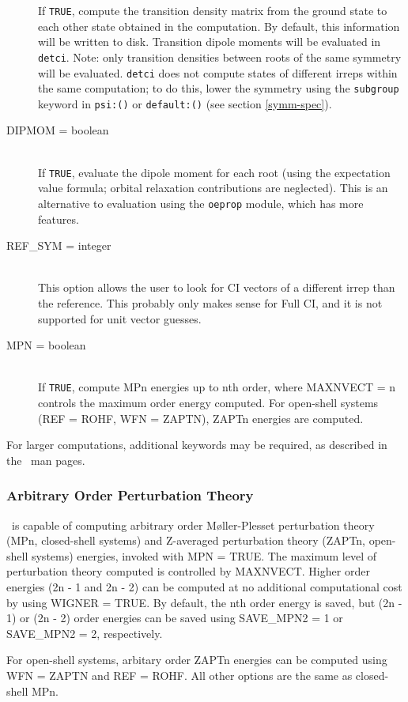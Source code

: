 \begin{description}
If {\tt TRUE}, compute the transition density matrix from the ground
state to each other state obtained in the computation.  By default,
this information will be written to disk.  Transition dipole moments
will be evaluated in {\tt detci}.  Note: only transition densities
between roots of the same symmetry will be evaluated.  {\tt detci} does not
compute states of different irreps within the same computation; to do this,
lower the symmetry using the {\tt subgroup} keyword in {\tt psi:()}
or {\tt default:()} (see section \ref{symm-spec}).
\item[DIPMOM = boolean]\mbox{}\\
If {\tt TRUE}, evaluate the dipole moment for each root (using the expectation
value formula; orbital relaxation contributions are neglected).  This is
an alternative to evaluation using the {\tt oeprop} module, which has
more features.
\item[REF\_SYM = integer]\mbox{}\\
This option allows the user to look for CI vectors of a different irrep
than the reference.  This probably only makes sense for Full CI,
and it is not supported for unit vector guesses.
\item[MPN = boolean]\mbox{}\\
If {\tt TRUE}, compute MPn energies up to nth order, where MAXNVECT = n
controls the maximum order energy computed.  For open-shell systems
(REF = ROHF, WFN = ZAPTN), ZAPTn energies are computed.
\end{description}

For larger computations, additional keywords may be required, as
described in the \PSIdetci\ man pages.

\subsubsection{Arbitrary Order Perturbation Theory}
\PSIthree\ is capable of computing arbitrary order M{\o}ller-Plesset
 perturbation theory (MPn, closed-shell systems) and 
Z-averaged perturbation theory (ZAPTn, open-shell systems) energies,
invoked with MPN = TRUE.  The maximum level of perturbation theory
computed is controlled by MAXNVECT.
Higher order energies (2n - 1 and 2n - 2) can be computed at no additional
computational cost by using WIGNER = TRUE.
By default, the n{th} order energy is saved, but (2n - 1) or (2n - 2) order 
energies can be saved using SAVE\_MPN2 = 1 or SAVE\_MPN2 = 2, respectively.

For open-shell systems, arbitary order ZAPTn energies can be computed using
WFN = ZAPTN and REF = ROHF.
All other options are the same as 
closed-shell MPn.
